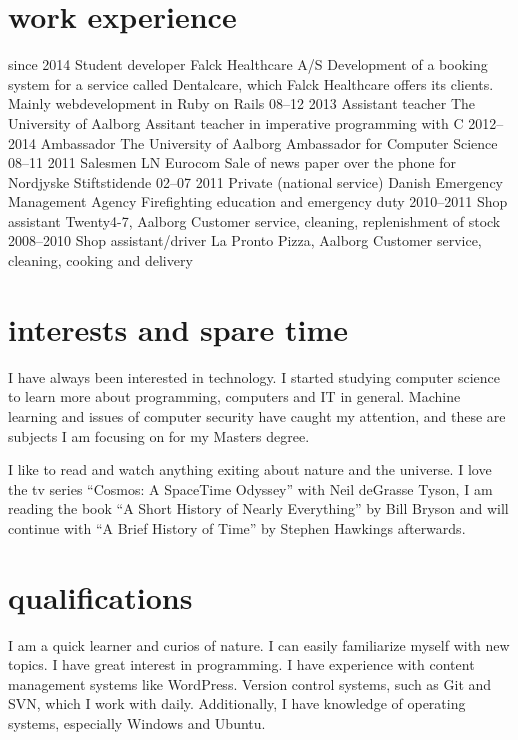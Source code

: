 \documentclass[]{friggeri-cv}
\begin{document}
\section{work experience}

\begin{entrylist}
  \entry
    {since 2014}
    {Student developer}
    {Falck Healthcare A/S}
    {Development of a booking system for a service called Dentalcare, which Falck Healthcare offers its clients. Mainly webdevelopment in Ruby on Rails}
  \entry
    {08–12 2013}
    {Assistant teacher}
    {The University of Aalborg}
    {Assitant teacher in imperative programming with C}
  \entry
    {2012–2014}
    {Ambassador}
    {The University of Aalborg}
    {Ambassador for Computer Science}
  \entry
    {08–11 2011}
    {Salesmen}
    {LN Eurocom}
    {Sale of news paper over the phone for Nordjyske Stiftstidende}
  \entry
    {02–07 2011}
    {Private (national service)}
    {Danish Emergency Management Agency}
    {Firefighting education and emergency duty}
  \entry
    {2010–2011}
    {Shop assistant}
    {Twenty4-7, Aalborg}
    {Customer service, cleaning, replenishment of stock}
  \entry
    {2008–2010}
    {Shop assistant/driver}
    {La Pronto Pizza, Aalborg}
    {Customer service, cleaning, cooking and delivery}
\end{entrylist}

\section{interests and spare time}
I have always been interested in technology. I started studying computer science to learn more about programming, computers and IT in general. Machine learning and issues of computer security have caught my attention, and these are subjects I am focusing on for my Masters degree.

I like to read and watch anything exiting about nature and the universe. I love the tv series ``Cosmos: A SpaceTime Odyssey'' with Neil deGrasse Tyson, I am reading the book ``A Short History of Nearly Everything'' by Bill Bryson and will continue with ``A Brief History of Time'' by Stephen Hawkings afterwards.

\section{qualifications}

I am a quick learner and curios of nature. I can easily familiarize myself with new topics. I have great interest in programming. I have experience with content management systems like WordPress. Version control systems, such as Git and SVN, which I work with daily. Additionally, I have knowledge of operating systems, especially Windows and Ubuntu.
\end{document}
